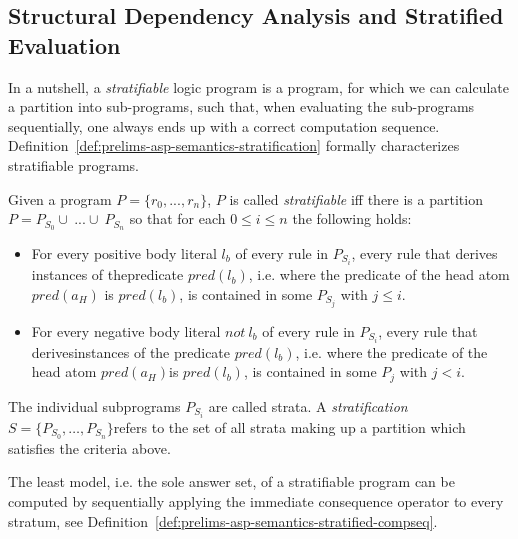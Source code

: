 \subsection{Structural Dependency Analysis and Stratified Evaluation}
\label{subsec:stratified-evaluation}

In a nutshell, a \emph{stratifiable} logic program is a program, for which we can calculate a partition into sub-programs, such that, when evaluating the sub-programs sequentially, one always ends up with a correct computation sequence. Definition~\ref{def:prelims-asp-semantics-stratification} formally characterizes stratifiable programs.

\begin{definition}
\label{def:prelims-asp-semantics-stratification}	
Given a program $P = \{r_{0}, ..., r_{n}\}$, $P$ is called \emph{stratifiable} iff there is a partition $P = P_{S_0} \cup\ ... \cup\ P_{S_n}$ so that for each $0 \le i \leq n$ the following holds:
\begin{itemize}
	\item For every positive body literal $l_{b}$ of every rule in $P_{S_i}$, every rule that derives instances of thepredicate $\mathit{pred}(l_{b})$, i.e. where the predicate of the head atom $\mathit{pred}(a_H)$ is $\mathit{pred}(l_{b})$, is contained in some $P_{S_j}$ with $j \leq i$.
	\item For every negative body literal $\mathit{not}\ l_{b}$ of every rule in $P_{S_i}$, every rule that derivesinstances of the predicate $\mathit{pred}(l_{b})$, i.e. where the predicate of the head atom $\mathit{pred}(a_H)$is $\mathit{pred}(l_{b})$, is contained in some $P_{j}$ with $j < i$.
\end{itemize}
The individual subprograms $P_{S_i}$ are called strata. A \emph{stratification} $S = \{P_{S_0},\ldots, P_{S_n}\}$refers to the set of all strata making up a partition which satisfies the criteria above.
\end{definition}

The least model, i.e. the sole answer set, of a stratifiable program can be computed by sequentially applying the immediate consequence operator to every stratum, see Definition~\ref{def:prelims-asp-semantics-stratified-compseq}.

